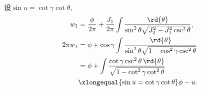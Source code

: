 \documentclass[../TheoreticalMechanics.tex]{subfiles}
\begin{document}
\begin{ex}
    \label{ex:平方反比问题下第一角变量关联至普通守恒量的积分}
    设$\sin u = \cot\gamma\cot\theta$,
    \begin{align*}
        w_1 &= \frac{\phi}{2\pi} + \frac{J_1}{2\pi} \int \frac{\rd{\theta}}{\sin^2\theta\sqrt{J_2^2 - J_1^2\csc^2\theta}},\\
        2\pi w_1 &= \phi + \cos\gamma \int \frac{\rd{\theta}}{\sin^2\theta\sqrt{1-\cos^2\gamma\csc^2\theta}}\\
        &= \phi + \int \frac{\cot\gamma\csc^2\theta\,\rd{\theta}}{\sqrt{1-\cot^2\gamma\cot^2\theta}}\\
        &\xlongequal{\sin u = \cot\gamma\cot\theta} \phi - u.
    \end{align*}
\end{ex}

\end{document}
